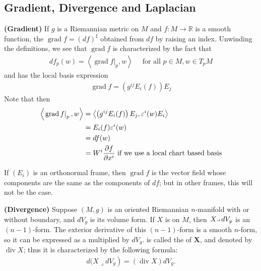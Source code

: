 \documentclass[12pt]{article} %
\newcommand{\bfs}[1]{\textbf{({#1}) }}
\begin{document}
\subsection{Gradient, Divergence and Laplacian}
\begin{defa}\bfs{Gradient}
If $g$ is a Riemannian metric on $M$ and $f: M \rightarrow \mathbb{R}$ is a smooth function, the  $\operatorname{grad} f=(d f)^{\sharp}$ obtained from $d f$ by raising an index. Unwinding the definitions, we see that  $\operatorname{grad} f$ is characterized by the fact that
\begin{align*}
d f_{p}(w)=\left\langle\left.\operatorname{grad} f\right|_{p}, w\right\rangle \quad \text { for all } p \in M, w \in T_{p} M
\end{align*}
and has the local basis expression
\begin{align*}
\operatorname{grad} f=\left(g^{i j} E_{i} (f)\right) E_{j}
\end{align*}
Note that then 
\begin{align*}
\left\langle\left.\operatorname{grad} f\right|_{p}, w\right\rangle &=\left\langle\left(g^{i j} E_{i} (f)\right) E_{j}, \varepsilon^{i} (w)E_{i} \right\rangle\\
& = E_i(f) \varepsilon^i(w) \\
& = df(w)\\
&= W^i \frac{\partial f}{\partial x^i}  \text{ if we use a local chart based basis}
\end{align*}
\end{defa}
\begin{lema}
 If $\left(E_{i}\right)$ is an orthonormal frame, then $\operatorname{grad} f$ is the vector field whose components are the same as the components of $d f$; but in other frames, this will not be the case.
\end{lema}
\begin{defa}\bfs{Divergence}
Suppose $(M, g)$ is an oriented Riemannian $n$-manifold with or without boundary, and $d V_{g}$ is its volume form. If $X$ is  on $M$, then $\left.X\right\lrcorner d V_{g}$ is an $(n-1)$-form. The exterior derivative of this $(n-1)$-form is a smooth $n$-form, so it can be expressed as a  multiplied by $d V_{g}$.  is called the  of $\boldsymbol{X}$, and denoted by $\operatorname{div} X$; thus it is characterized by the following formula:
\begin{align*}
\left.d(X\lrcorner d V_{g}\right)=(\operatorname{div} X) d V_{g} .
\end{align*}
\end{defa}
\end{document}
